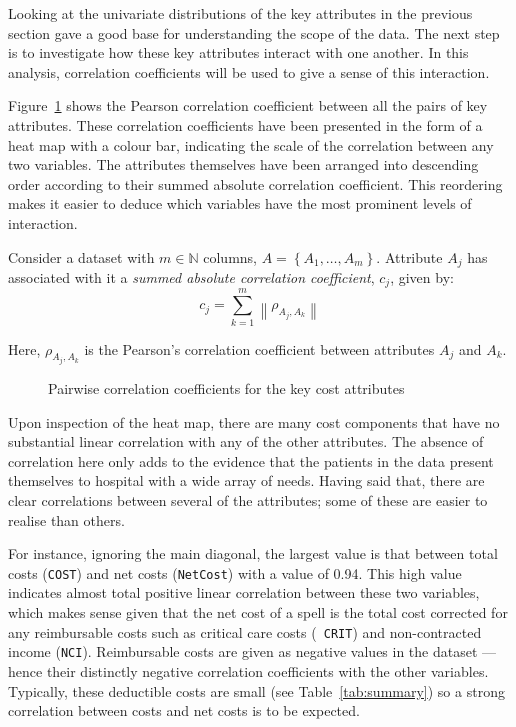 Looking at the univariate distributions of the key attributes in the previous
section gave a good base for understanding the scope of the data. The next step
is to investigate how these key attributes interact with one another. In this
analysis, correlation coefficients will be used to give a sense of this
interaction.

Figure~\ref{fig:corr_heatmap} shows the Pearson correlation coefficient between
all the pairs of key attributes. These correlation coefficients have been
presented in the form of a heat map with a colour bar, indicating the scale of
the correlation between any two variables. The attributes themselves have been
arranged into descending order according to their summed absolute correlation
coefficient. This reordering makes it easier to deduce which variables have the
most prominent levels of interaction.

\begin{definition}
    Consider a dataset with \(m \in \mathbb{N}\) columns,
    \(A = \left\{A_1, \ldots, A_m\right\}\). Attribute \(A_j\) has
    associated with it a \emph{summed absolute correlation coefficient},
    \(c_j\), given by:
    \begin{equation}\label{eq:abs_corr}
        c_j = \sum_{k=1}^{m} \left\| \rho_{A_j, A_k} \right\|
    \end{equation}

    Here, \(\rho_{A_j, A_k}\) is the Pearson's correlation coefficient
    between attributes \(A_j\) and \(A_k\).
\end{definition}

\begin{figure}
    \caption{%
        Pairwise correlation coefficients for the key cost attributes
    }\label{fig:corr_heatmap}
\end{figure}

Upon inspection of the heat map, there are many cost components that have no
substantial linear correlation with any of the other attributes. The absence of
correlation here only adds to the evidence that the patients in the data present
themselves to hospital with a wide array of needs. Having said that, there are
clear correlations between several of the attributes; some of these are easier
to realise than others.

For instance, ignoring the main diagonal, the largest value is that between
total costs ({\tt COST}) and net costs ({\tt NetCost}) with a value of 0.94.
This high value indicates almost total positive linear correlation between these
two variables, which makes sense given that the net cost of a spell is the total
cost corrected for any reimbursable costs such as critical care costs ({\tt
CRIT}) and non-contracted income ({\tt NCI}). Reimbursable costs are given as
negative values in the dataset --- hence their distinctly negative correlation
coefficients with the other variables. Typically, these deductible costs are
small (see Table~\ref{tab:summary}) so a strong correlation between costs and
net costs is to be expected.

